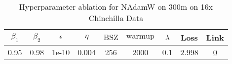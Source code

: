 \begin{table}[H]
\centering
\caption{Hyperparameter ablation for NAdamW on 300m on 16x Chinchilla Data}
\label{tab:ablation_nadamw_300m_16}
\begin{tabular}{ccccccccc}
\toprule
$\beta_1$ & $\beta_2$ & $\epsilon$ & $\eta$ & $\mathrm{BSZ}$ & $\mathrm{warmup}$ & $\lambda$ & Loss & Link \\
\midrule
0.95 & 0.98 & 1e-10 & 0.004 & 256 & 2000 & 0.1 & 2.998 & \href{https://wandb.ai/stanford-mercury/optimizer-scaling/runs/sweep-300m-96B-nadamw860e52lr0.004-wd0.1-minlr0-warmup2000-b10.9-8d9fe1}{0} \\
\midrule
\bottomrule
\end{tabular}
\end{table}

